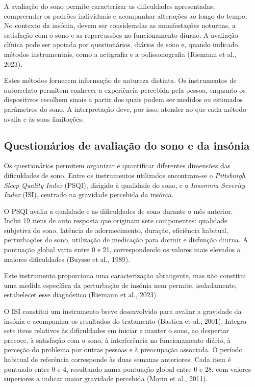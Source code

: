A avaliação do sono permite caracterizar as dificuldades apresentadas, compreender os padrões individuais e acompanhar alterações ao longo do tempo. No contexto da insónia, devem ser consideradas as manifestações noturnas, a satisfação com o sono e as repercussões no funcionamento diurno. A avaliação clínica pode ser apoiada por questionários, diários de sono e, quando indicado, métodos instrumentais, como a actigrafia e a polissonografia (Riemann et al., 2023).

Estes métodos fornecem informação de natureza distinta. Os instrumentos de autorrelato permitem conhecer a experiência percebida pela pessoa, enquanto os dispositivos recolhem sinais a partir dos quais podem ser medidos ou estimados parâmetros do sono. A interpretação deve, por isso, atender ao que cada método avalia e às suas limitações.


\subsection{Questionários de avaliação do sono e da insónia}
\label{sec:chap2_questionarioSono}

Os questionários permitem organizar e quantificar diferentes dimensões das dificuldades de sono. Entre os instrumentos utilizados encontram-se o \textit{Pittsburgh Sleep Quality Index }(PSQI), dirigido à qualidade do sono, e o \textit{Insomnia Severity Index} (ISI), centrado na gravidade percebida da insónia.

O PSQI avalia a qualidade e as dificuldades de sono durante o mês anterior. Inclui 19 itens de auto resposta que originam sete componentes: qualidade subjetiva do sono, latência de adormecimento, duração, eficiência habitual, perturbações do sono, utilização de medicação para dormir e disfunção diurna. A pontuação global varia entre 0 e 21, correspondendo os valores mais elevados a maiores dificuldades (Buysse et al., 1989).

Este instrumento proporciona uma caracterização abrangente, mas não constitui uma medida específica da perturbação de insónia nem permite, isoladamente, estabelecer esse diagnóstico (Riemann et al., 2023).

O ISI constitui um instrumento breve desenvolvido para avaliar a gravidade da insónia e acompanhar os resultados do tratamento (Bastien et al., 2001). Integra sete itens relativos às dificuldades em iniciar e manter o sono, ao despertar precoce, à satisfação com o sono, à interferência no funcionamento diário, à perceção do problema por outras pessoas e à preocupação associada. O período habitual de referência corresponde às duas semanas anteriores. Cada item é pontuado entre 0 e 4, resultando numa pontuação global entre 0 e 28, com valores superiores a indicar maior gravidade percebida (Morin et al., 2011).

